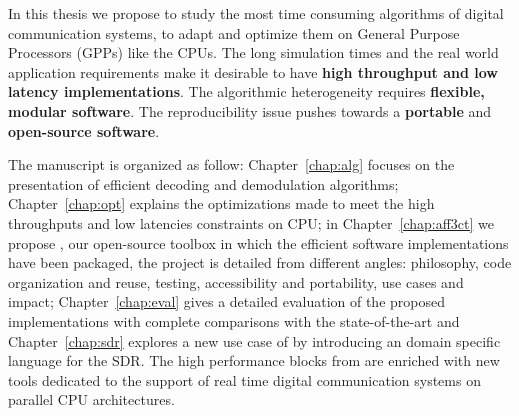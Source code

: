 In this thesis we propose to study the most time consuming algorithms of digital
communication systems, to adapt and optimize them on General Purpose Processors
(GPPs) like the CPUs. The long simulation times and the real world application
requirements make it desirable to have \textbf{high throughput and low latency
implementations}. The algorithmic heterogeneity requires \textbf{flexible,
modular software}. The reproducibility issue pushes towards a \textbf{portable}
and \textbf{open-source software}.

The manuscript is organized as follow: Chapter~\ref{chap:alg} focuses on the
presentation of efficient decoding and demodulation algorithms;
Chapter~\ref{chap:opt} explains the optimizations made to meet the high
throughputs and low latencies constraints on CPU; in Chapter~\ref{chap:aff3ct}
we propose \AFFECT, our open-source toolbox in which the efficient software
implementations have been packaged, the project is detailed from different
angles: philosophy, code organization and reuse, testing, accessibility and
portability, use cases and impact; Chapter~\ref{chap:eval} gives a detailed
evaluation of the proposed implementations with complete comparisons with the
state-of-the-art and Chapter~\ref{chap:sdr} explores a new use case of \AFFECT
by introducing an domain specific language for the SDR. The high performance
blocks from \AFFECT are enriched with new tools dedicated to the support of real
time digital communication systems on parallel CPU architectures.
